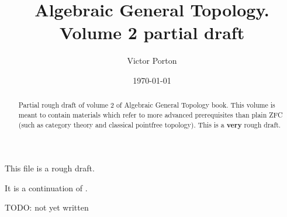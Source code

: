 \documentclass[a4paper,oneside,english,reqno]{amsbook}
\begin{document}
\title{Algebraic General Topology. Volume 2 partial draft}

\author{Victor Porton}





\date{\today}


\begin{abstract}
Partial rough draft of volume 2 of Algebraic General Topology book.
This volume is meant to contain materials which refer to more advanced
prerequisites than plain ZFC (such as category theory and classical pointfree
topology). This is a \textbf{very} rough draft.
\end{abstract}





\maketitle

\tableofcontents{}

This file is a rough draft.

It is a continuation of \cite{volume-1}.















TODO: not yet written




\end{document}
